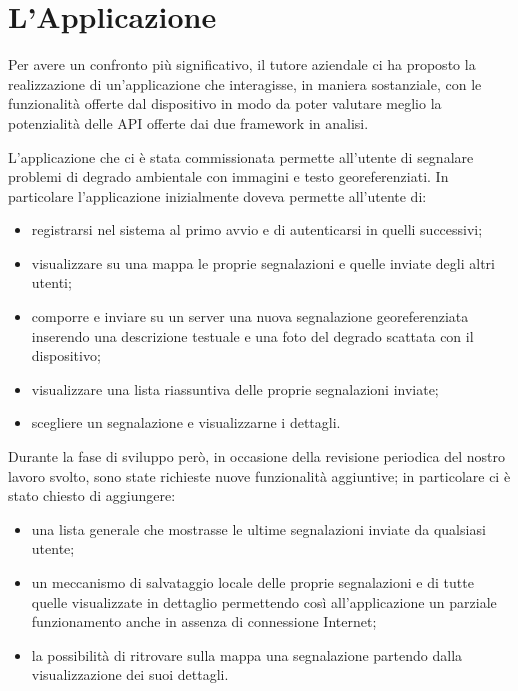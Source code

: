 \chapter{L'Applicazione}
	Per avere un confronto più significativo, il tutore aziendale ci ha proposto
	la realizzazione di un'applicazione che interagisse, in maniera sostanziale,
	con le funzionalità offerte dal dispositivo in modo da poter valutare meglio
	la potenzialità delle API offerte dai due framework in analisi.
	
	L'applicazione che ci è stata commissionata permette all'utente di segnalare 
	problemi di degrado ambientale con immagini e testo georeferenziati.
	In particolare l'applicazione inizialmente doveva permette all'utente di:
	\begin{itemize}
		\item registrarsi nel sistema al primo avvio e di autenticarsi in quelli
		      successivi;
		\item visualizzare su una mappa le proprie segnalazioni e quelle inviate
		      degli altri utenti;
		\item comporre e inviare su un server una nuova segnalazione
		      georeferenziata inserendo una descrizione testuale e una foto del
		      degrado scattata con il dispositivo;
		\item visualizzare una lista riassuntiva delle proprie segnalazioni
		      inviate;
		\item scegliere un segnalazione e visualizzarne i dettagli.
	\end{itemize}
	Durante la fase di sviluppo però, in occasione della revisione periodica del
	nostro lavoro svolto, sono state richieste nuove funzionalità aggiuntive; in
	particolare ci è stato chiesto di aggiungere:
	\begin{itemize}
		\item una lista generale che mostrasse le ultime segnalazioni inviate da
		      qualsiasi utente;
		\item un meccanismo di salvataggio locale delle proprie segnalazioni e
		      di tutte quelle visualizzate in dettaglio permettendo così
		      all'applicazione un parziale funzionamento anche in assenza di
		      connessione Internet;
		\item la possibilità di ritrovare sulla mappa una segnalazione partendo
		      dalla visualizzazione dei suoi dettagli.
	\end{itemize}
	
